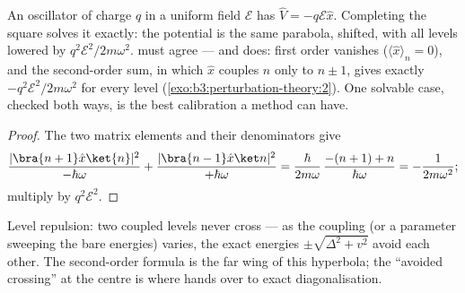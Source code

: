 \begin{proposition}\label{prop:b3:perturbation-theory:oscillator-field}
An oscillator of charge $q$ in a uniform field $\mathcal E$ has
$\hat V = -q\mathcal E\hat x$. Completing the square solves it
exactly: the potential is the same parabola, shifted, with all
levels lowered by $q^2\mathcal E^2/2m\omega^2$. 
must agree --- and does: first order vanishes ($\langle\hat
x\rangle_n = 0$), and the second-order sum, in which $\hat x$
couples $n$ only to $n \pm 1$, gives exactly
$-q^2\mathcal E^2/2m\omega^2$ for every level
(\cref{exo:b3:perturbation-theory:2}). One solvable case, checked
both ways, is the best calibration a method can have.
\end{proposition}

\begin{proof}
The two matrix elements and their denominators give
\[
\frac{|\bra{n+1}\hat x\ket{n}|^2}{-\hbar\omega}
 + \frac{|\bra{n-1}\hat x\ket n|^2}{+\hbar\omega}
 = \frac{\hbar}{2m\omega}\,\frac{-(n+1) + n}{\hbar\omega}
 = -\frac{1}{2m\omega^2} ;
\]
multiply by $q^2\mathcal E^2$.
\end{proof}

\begin{omfigure}

{\small Level repulsion: two coupled levels never cross --- as the
coupling (or a parameter sweeping the bare energies) varies, the
exact energies $\pm\sqrt{\Delta^2 + v^2}$ avoid each other. The
second-order formula is the far wing of this hyperbola; the
``avoided crossing'' at the centre is where 
hands over to exact diagonalisation.}
\end{omfigure}

